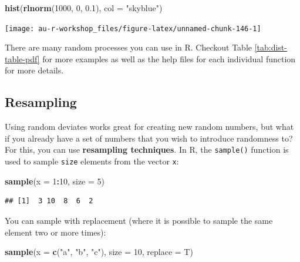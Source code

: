 \documentclass[]{book}
\newenvironment{Shaded}{\begin{snugshade}}{\end{snugshade}}
\newcommand{\KeywordTok}[1]{\textcolor[rgb]{0.13,0.29,0.53}{\textbf{#1}}}
\newcommand{\DataTypeTok}[1]{\textcolor[rgb]{0.13,0.29,0.53}{#1}}
\newcommand{\DecValTok}[1]{\textcolor[rgb]{0.00,0.00,0.81}{#1}}
\newcommand{\FloatTok}[1]{\textcolor[rgb]{0.00,0.00,0.81}{#1}}
\newcommand{\StringTok}[1]{\textcolor[rgb]{0.31,0.60,0.02}{#1}}
\newcommand{\OperatorTok}[1]{\textcolor[rgb]{0.81,0.36,0.00}{\textbf{#1}}}
\newcommand{\NormalTok}[1]{#1}
\theoremstyle{definition}
\theoremstyle{definition}
\theoremstyle{definition}
\theoremstyle{remark}
\begin{document}
\begin{Shaded}
\begin{Highlighting}[]
\KeywordTok{hist}\NormalTok{(}\KeywordTok{rlnorm}\NormalTok{(}\DecValTok{1000}\NormalTok{, }\DecValTok{0}\NormalTok{, }\FloatTok{0.1}\NormalTok{), }\DataTypeTok{col =} \StringTok{"skyblue"}\NormalTok{)}
\end{Highlighting}
\end{Shaded}

\begin{center}\texttt{[image: au-r-workshop\_files/figure-latex/unnamed-chunk-146-1]} \end{center}

There are many random processes you can use in R. Checkout Table
\ref{tab:dist-table-pdf} for more examples as well as the help files for
each individual function for more details.

\subsection{Resampling}\label{resampling}

Using random deviates works great for creating new random numbers, but
what if you already have a set of numbers that you wish to introduce
randomness to? For this, you can use \textbf{resampling techniques}. In
R, the \texttt{sample()} function is used to sample \texttt{size}
elements from the vector \texttt{x}:

\begin{Shaded}
\begin{Highlighting}[]
\KeywordTok{sample}\NormalTok{(}\DataTypeTok{x =} \DecValTok{1}\OperatorTok{:}\DecValTok{10}\NormalTok{, }\DataTypeTok{size =} \DecValTok{5}\NormalTok{)}
\end{Highlighting}
\end{Shaded}

\begin{verbatim}
## [1]  3 10  8  6  2
\end{verbatim}

You can sample with replacement (where it is possible to sample the same
element two or more times):

\begin{Shaded}
\begin{Highlighting}[]
\KeywordTok{sample}\NormalTok{(}\DataTypeTok{x =} \KeywordTok{c}\NormalTok{(}\StringTok{"a"}\NormalTok{, }\StringTok{"b"}\NormalTok{, }\StringTok{"c"}\NormalTok{), }\DataTypeTok{size =} \DecValTok{10}\NormalTok{, }\DataTypeTok{replace =}\NormalTok{ T)}
\end{Highlighting}
\end{Shaded}
\end{document}
